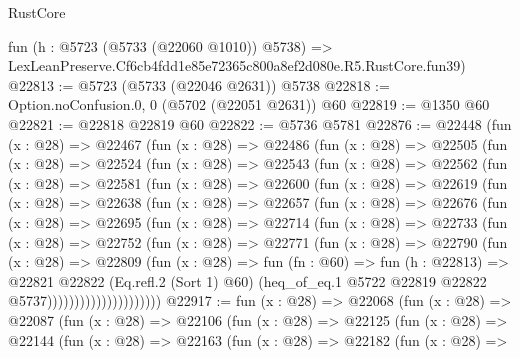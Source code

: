 \begin{lexlean}{RustCore}
\begin{coremodule}
    fun (h : @5723 (@5733 (@22060 @1010)) @5738) =>
    LexLeanPreserve.Cf6cb4fdd1e85e72365c800a8ef2d080e.R5.RustCore.fun39)
@22813 := @5723 (@5733 (@22046 @2631)) @5738
@22818 := Option.noConfusion.{0, 0} (@5702 (@22051 @2631)) @60
@22819 := @1350 @60
@22821 := @22818 @22819 @60
@22822 := @5736 @5781
@22876 := @22448
    (fun (x : @28) =>
    @22467
      (fun (x : @28) =>
      @22486
        (fun (x : @28) =>
        @22505
          (fun (x : @28) =>
          @22524
            (fun (x : @28) =>
            @22543
              (fun (x : @28) =>
              @22562
                (fun (x : @28) =>
                @22581
                  (fun (x : @28) =>
                  @22600
                    (fun (x : @28) =>
                    @22619
                      (fun (x : @28) =>
                      @22638
                        (fun (x : @28) =>
                        @22657
                          (fun (x : @28) =>
                          @22676
                            (fun (x : @28) =>
                            @22695
                              (fun (x : @28) =>
                              @22714
                                (fun (x : @28) =>
                                @22733
                                  (fun (x : @28) =>
                                  @22752
                                    (fun (x : @28) =>
                                    @22771
                                      (fun (x : @28) =>
                                      @22790
                                        (fun (x : @28) =>
                                        @22809
                                          (fun (x : @28) =>
                                          fun (fn : @60) =>
                                          fun (h : @22813) =>
                                          @22821
                                            @22822
                                            (Eq.refl.{2} (Sort 1) @60)
                                            (heq_of_eq.{1}
                                              @5722
                                              @22819
                                              @22822
                                              @5737)))))))))))))))))))))
@22917 := fun (x : @28) =>
  @22068
    (fun (x : @28) =>
    @22087
      (fun (x : @28) =>
      @22106
        (fun (x : @28) =>
        @22125
          (fun (x : @28) =>
          @22144
            (fun (x : @28) =>
            @22163
              (fun (x : @28) =>
              @22182
                (fun (x : @28) =>

\end{coremodule}
\end{lexlean}
